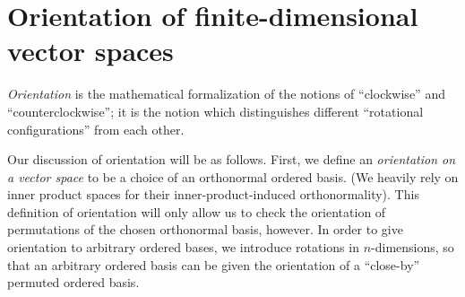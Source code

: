     
    


\newpage

\section{Orientation of finite-dimensional vector spaces}
\label{ch::exterior_pwrs::section::orientation}

\textit{Orientation} is the mathematical formalization of the notions of ``clockwise'' and ``counterclockwise''; it is the notion which distinguishes different ``rotational configurations'' from each other.

Our discussion of orientation will be as follows. First, we define an \textit{orientation on a vector space} to be a choice of an orthonormal ordered basis. (We heavily rely on inner product spaces for their inner-product-induced orthonormality). This definition of orientation will only allow us to check the orientation of permutations of the chosen orthonormal basis, however. In order to give orientation to arbitrary ordered bases, we introduce rotations in $n$-dimensions, so that an arbitrary ordered basis can be given the orientation of a ``close-by'' permuted ordered basis.

